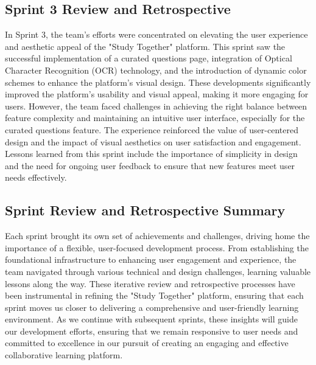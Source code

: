 \subsection{Sprint 3 Review and Retrospective}\label{sprint3_review_retrospective}
In Sprint 3, the team's efforts were concentrated on elevating the user experience and aesthetic appeal of the "Study Together" platform. This sprint saw the successful implementation of a curated questions page, integration of Optical Character Recognition (OCR) technology, and the introduction of dynamic color schemes to enhance the platform's visual design. These developments significantly improved the platform's usability and visual appeal, making it more engaging for users. However, the team faced challenges in achieving the right balance between feature complexity and maintaining an intuitive user interface, especially for the curated questions feature. The experience reinforced the value of user-centered design and the impact of visual aesthetics on user satisfaction and engagement. Lessons learned from this sprint include the importance of simplicity in design and the need for ongoing user feedback to ensure that new features meet user needs effectively.


\subsection{Sprint Review and Retrospective Summary}\label{sprint_review_retrospective_summary}
Each sprint brought its own set of achievements and challenges, driving home the importance of a flexible, user-focused development process. From establishing the foundational infrastructure to enhancing user engagement and experience, the team navigated through various technical and design challenges, learning valuable lessons along the way. These iterative review and retrospective processes have been instrumental in refining the "Study Together" platform, ensuring that each sprint moves us closer to delivering a comprehensive and user-friendly learning environment. As we continue with subsequent sprints, these insights will guide our development efforts, ensuring that we remain responsive to user needs and committed to excellence in our pursuit of creating an engaging and effective collaborative learning platform.


